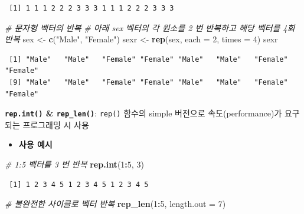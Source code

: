 \documentclass[
  11pt,
]{krantz}
\newenvironment{Shaded}{\begin{snugshade}}{\end{snugshade}}
\newcommand{\CommentTok}[1]{\textcolor[rgb]{0.37,0.37,0.37}{\textit{#1}}}
\newcommand{\DataTypeTok}[1]{\textcolor[rgb]{0.27,0.27,0.27}{#1}}
\newcommand{\DecValTok}[1]{\textcolor[rgb]{0.06,0.06,0.06}{#1}}
\newcommand{\KeywordTok}[1]{\textcolor[rgb]{0.27,0.27,0.27}{\textbf{#1}}}
\newcommand{\NormalTok}[1]{#1}
\newcommand{\OperatorTok}[1]{\textcolor[rgb]{0.43,0.43,0.43}{\textbf{#1}}}
\newcommand{\StringTok}[1]{\textcolor[rgb]{0.5,0.5,0.5}{#1}}
\providecommand{\tightlist}{%
  \setlength{\itemsep}{0pt}\setlength{\parskip}{0pt}}
\begin{document}
\begin{verbatim}
 [1] 1 1 1 2 2 2 3 3 3 1 1 1 2 2 2 3 3 3
\end{verbatim}

\begin{Shaded}
\begin{Highlighting}[]
\CommentTok{# 문자형 벡터의 반복}
\CommentTok{# 아래 sex 벡터의 각 원소를 2 번 반복하고 해당 벡터를 4회 반복}
\NormalTok{sex <-}\StringTok{ }\KeywordTok{c}\NormalTok{(}\StringTok{"Male"}\NormalTok{, }\StringTok{"Female"}\NormalTok{)}
\NormalTok{sexr <-}\StringTok{ }\KeywordTok{rep}\NormalTok{(sex, }\DataTypeTok{each =} \DecValTok{2}\NormalTok{, }\DataTypeTok{times =} \DecValTok{4}\NormalTok{)}
\NormalTok{sexr}
\end{Highlighting}
\end{Shaded}

\begin{verbatim}
 [1] "Male"   "Male"   "Female" "Female" "Male"   "Male"   "Female" "Female"
 [9] "Male"   "Male"   "Female" "Female" "Male"   "Male"   "Female" "Female"
\end{verbatim}

\normalsize

\textbf{\texttt{rep.int()} \& \texttt{rep\_len()}}: \texttt{rep()} 함수의 simple 버전으로 속도(performance)가 요구되는 프로그래밍 시 사용

\begin{itemize}
\tightlist
\item
  \textbf{사용 예시}
\end{itemize}

\footnotesize

\begin{Shaded}
\begin{Highlighting}[]
\CommentTok{# 1:5 벡터를 3 번 반복}
\KeywordTok{rep.int}\NormalTok{(}\DecValTok{1}\OperatorTok{:}\DecValTok{5}\NormalTok{, }\DecValTok{3}\NormalTok{)}
\end{Highlighting}
\end{Shaded}

\begin{verbatim}
 [1] 1 2 3 4 5 1 2 3 4 5 1 2 3 4 5
\end{verbatim}

\begin{Shaded}
\begin{Highlighting}[]
\CommentTok{# 불완전한 사이클로 벡터 반복}
\KeywordTok{rep_len}\NormalTok{(}\DecValTok{1}\OperatorTok{:}\DecValTok{5}\NormalTok{, }\DataTypeTok{length.out =} \DecValTok{7}\NormalTok{)}
\end{Highlighting}
\end{Shaded}
\end{document}
